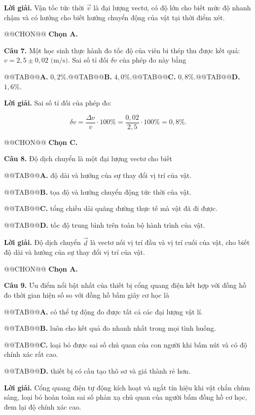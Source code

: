 \documentclass{article}
\begin{document}
\textbf{Lời giải.} Vận tốc tức thời $\vec{v}$ là đại lượng vectơ, có độ lớn cho biết mức độ nhanh chậm và có hướng cho biết hướng chuyển động của vật tại thời điểm xét.

@@CHON@@ \textbf{Chọn A.}

\textbf{Câu 7.} Một học sinh thực hành đo tốc độ của viên bi thép thu được kết quả: $v = 2{,}5 \pm 0{,}02\text{ (m/s)}$. Sai số tỉ đối $\delta v$ của phép đo này bằng

@@TAB@@\textbf{A.} $0{,}2\%$.@@TAB@@\textbf{B.} $4{,}0\%$.@@TAB@@\textbf{C.} $0{,}8\%$.@@TAB@@\textbf{D.} $1{,}6\%$.

\textbf{Lời giải.} Sai số tỉ đối của phép đo:

\[\delta v = \frac{\Delta v}{\overline{v}} \cdot 100\% = \frac{0{,}02}{2{,}5} \cdot 100\% = 0{,}8\%.\]

@@CHON@@ \textbf{Chọn C.}

\textbf{Câu 8.} Độ dịch chuyển là một đại lượng vectơ cho biết

@@TAB@@\textbf{A.} độ dài và hướng của sự thay đổi vị trí của vật.

@@TAB@@\textbf{B.} tọa độ và hướng chuyển động tức thời của vật.

@@TAB@@\textbf{C.} tổng chiều dài quãng đường thực tế mà vật đã đi được.

@@TAB@@\textbf{D.} tốc độ trung bình trên toàn bộ hành trình của vật.

\textbf{Lời giải.} Độ dịch chuyển $\vec{d}$ là vectơ nối vị trí đầu và vị trí cuối của vật, cho biết độ dài và hướng của sự thay đổi vị trí của vật.

@@CHON@@ \textbf{Chọn A.}

\textbf{Câu 9.} Ưu điểm nổi bật nhất của thiết bị cổng quang điện kết hợp với đồng hồ đo thời gian hiện số so với đồng hồ bấm giây cơ học là

@@TAB@@\textbf{A.} có thể tự động đo được tất cả các đại lượng vật lí.

@@TAB@@\textbf{B.} luôn cho kết quả đo nhanh nhất trong mọi tình huống.

@@TAB@@\textbf{C.} loại bỏ được sai số chủ quan của con người khi bấm nút và có độ chính xác rất cao.

@@TAB@@\textbf{D.} thiết bị có cấu tạo thô sơ và giá thành rẻ hơn.

\textbf{Lời giải.} Cổng quang điện tự động kích hoạt và ngắt tín hiệu khi vật chắn chùm sáng, loại bỏ hoàn toàn sai số phản xạ chủ quan của người bấm đồng hồ cơ học, đem lại độ chính xác cao.
\end{document}

